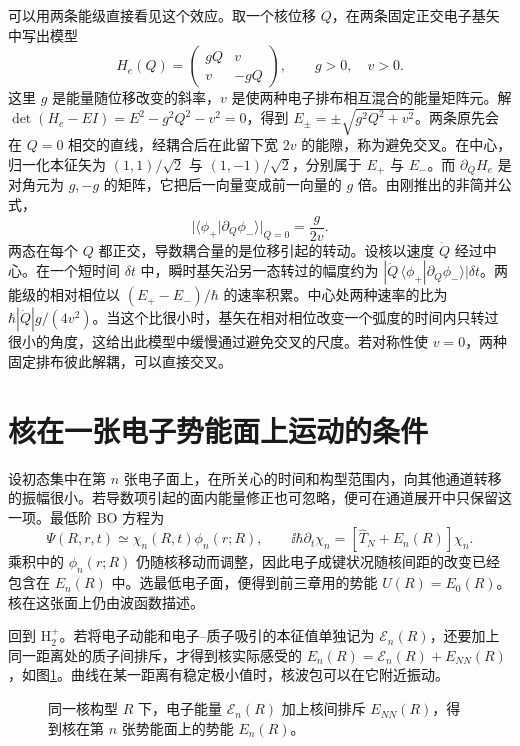 可以用两条能级直接看见这个效应。取一个核位移 $Q$，在两条固定正交电子基矢中写出模型
\begin{equation}\label{bo:avoided-crossing}
 H_e(Q)=\begin{pmatrix}gQ&v\\v&-gQ\end{pmatrix},\qquad g>0,\quad v>0 .
\end{equation}
这里 $g$ 是能量随位移改变的斜率，$v$ 是使两种电子排布相互混合的能量矩阵元。解 $\det(H_e-EI)=E^2-g^2Q^2-v^2=0$，得到 $E_\pm=\pm\sqrt{g^2Q^2+v^2}$。两条原先会在 $Q=0$ 相交的直线，经耦合后在此留下宽 $2v$ 的能隙，称为避免交叉。在中心，归一化本征矢为 $(1,1)/\sqrt2$ 与 $(1,-1)/\sqrt2$，分别属于 $E_+$ 与 $E_-$。而 $\partial_QH_e$ 是对角元为 $g,-g$ 的矩阵，它把后一向量变成前一向量的 $g$ 倍。由刚推出的非简并公式，
\[
 \big|\langle\phi_+|\partial_Q\phi_-\rangle\big|_{Q=0}
 =\frac{g}{2v}.
\]
两态在每个 $Q$ 都正交，导数耦合量的是位移引起的转动。设核以速度 $\dot Q$ 经过中心。在一个短时间 $\delta t$ 中，瞬时基矢沿另一态转过的幅度约为 $|\dot Q\,\langle\phi_+|\partial_Q\phi_-\rangle|\delta t$。两能级的相对相位以 $(E_+-E_-)/\hbar$ 的速率积累。中心处两种速率的比为 $\hbar|\dot Q|g/(4v^2)$。当这个比很小时，基矢在相对相位改变一个弧度的时间内只转过很小的角度，这给出此模型中缓慢通过避免交叉的尺度。若对称性使 $v=0$，两种固定排布彼此解耦，可以直接交叉。

\section{核在一张电子势能面上运动的条件}\label{bo:approx}
设初态集中在第 $n$ 张电子面上，在所关心的时间和构型范围内，向其他通道转移的振幅很小。若导数项引起的面内能量修正也可忽略，便可在通道展开中只保留这一项。最低阶 BO 方程为
\begin{equation}
\Psi(R,r,t)\simeq\chi_n(R,t)\phi_n(r;R),\qquad
\ii\hbar\partial_t\chi_n=[\hat T_N+E_n(R)]\chi_n.
\end{equation}
乘积中的 $\phi_n(r;R)$ 仍随核移动而调整，因此电子成键状况随核间距的改变已经包含在 $E_n(R)$ 中。选最低电子面，便得到前三章用的势能 $U(R)=E_0(R)$。核在这张面上仍由波函数描述。

回到 $\mathrm H_2^+$。若将电子动能和电子--质子吸引的本征值单独记为 $\mathcal E_n(R)$，还要加上同一距离处的质子间排斥，才得到核实际感受的 $E_n(R)=\mathcal E_n(R)+E_{NN}(R)$，如图\ref{bo:energy-accounting}。曲线在某一距离有稳定极小值时，核波包可以在它附近振动。

\begin{figure}[htbp]
\centering

\caption{同一核构型 $R$ 下，电子能量 $\mathcal E_n(R)$ 加上核间排斥 $E_{NN}(R)$，得到核在第 $n$ 张势能面上的势能 $E_n(R)$。}
\label{bo:energy-accounting}
\end{figure}

